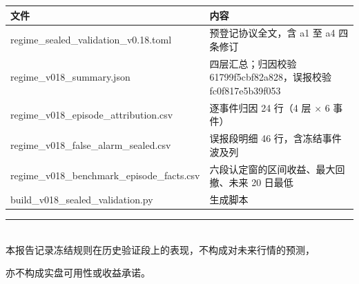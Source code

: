 \documentclass[12pt,a4paper]{ctexart}
\begin{document}
\begin{center}\footnotesize
\begin{tabularx}{\textwidth}{@{}>{\raggedright\arraybackslash}p{6.6cm}Y@{}}
\toprule
\textbf{文件} & \textbf{内容} \\
\midrule
regime\_\hspace{0pt}sealed\_\hspace{0pt}validation\_\hspace{0pt}v0.18.toml & 预登记协议全文，含 a1 至 a4 四条修订 \\
regime\_\hspace{0pt}v018\_\hspace{0pt}summary.json & 四层汇总；归因校验 61799f5cbf82a828，误报校验 fc0f817e5b39f053 \\
regime\_\hspace{0pt}v018\_\hspace{0pt}episode\_\hspace{0pt}attribution.csv & 逐事件归因 24 行（4 层 $\times$ 6 事件）\\
regime\_\hspace{0pt}v018\_\hspace{0pt}false\_\hspace{0pt}alarm\_\hspace{0pt}sealed.csv & 误报段明细 46 行，含冻结事件波及列 \\
regime\_\hspace{0pt}v018\_\hspace{0pt}benchmark\_\hspace{0pt}episode\_\hspace{0pt}facts.csv & 六段认定窗的区间收益、最大回撤、未来 20 日最低 \\
build\_\hspace{0pt}v018\_\hspace{0pt}sealed\_\hspace{0pt}validation.py & 生成脚本 \\
\bottomrule
\end{tabularx}
\end{center}

\vspace{1.5em}
\begin{center}\small
\rule{0.62\textwidth}{0.4pt}\\[0.5em]
本报告记录冻结规则在历史验证段上的表现，不构成对未来行情的预测，\par
亦不构成实盘可用性或收益承诺。
\end{center}
\end{document}

